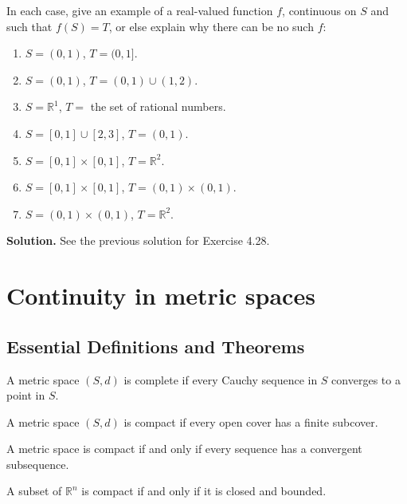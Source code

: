 \begin{problembox}
In each case, give an example of a real-valued function $f$, continuous on $S$ and such that $f(S) = T$, or else explain why there can be no such $f$:
\begin{enumerate}[label=(\alph*)]
\item $S = (0, 1)$, $T = (0, 1]$.
\item $S = (0, 1)$, $T = (0, 1) \cup (1, 2)$.
\item $S = \mathbb{R}^1$, $T =$ the set of rational numbers.
\item $S = [0, 1] \cup [2, 3]$, $T = (0, 1)$.
\item $S = [0, 1] \times [0, 1]$, $T = \mathbb{R}^2$.
\item $S = [0, 1] \times [0, 1]$, $T = (0, 1) \times (0, 1)$.
\item $S = (0, 1) \times (0, 1)$, $T = \mathbb{R}^2$.
\end{enumerate}
\end{problembox}

\noindent\textbf{Solution.} See the previous solution for Exercise 4.28.
\medskip

\section{Continuity in metric spaces}

\subsection*{Essential Definitions and Theorems}

\begin{definition}
A metric space $(S,d)$ is complete if every Cauchy sequence in $S$ converges to a point in $S$.
\end{definition}

\begin{definition}
A metric space $(S,d)$ is compact if every open cover has a finite subcover.
\end{definition}

\begin{theorem}
A metric space is compact if and only if every sequence has a convergent subsequence.
\end{theorem}

\begin{theorem}
A subset of $\mathbb{R}^n$ is compact if and only if it is closed and bounded.
\end{theorem}

